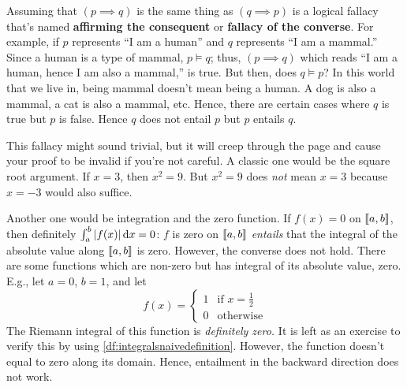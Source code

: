 Assuming that \((p \implies q)\) is the same thing as \((q \implies p)\) is a logical fallacy that's named \textbf{affirming the consequent} or \textbf{fallacy of the converse}. For example, if \(p\) represents \enquote{I am a human} and \(q\) represents \enquote{I am a mammal.} Since a human is a type of mammal, \(p \models q\); thus, \((p \implies q)\) which reads \enquote{I am a human, hence I am also a mammal,} is true. But then, does \(q \models p\)? In this world that we live in, being mammal doesn't mean being a human. A dog is also a mammal, a cat is also a mammal, etc. Hence, there are certain cases where \(q\) is true but \(p\) is false. Hence \(q\) does not entail \(p\) but \(p\) entails \(q\).

This fallacy might sound trivial, but it will creep through the page and cause your proof to be invalid if you're not careful. A classic one would be the square root argument. If \(x = 3\), then \(x^2 = 9\). But \(x^2 = 9\) does \emph{not} mean \(x = 3\) because \(x = -3\) would also suffice.

Another one would be integration and the zero function. If \(f(x) = 0\) on \(\cintv{a, b}\), then definitely \(\int_a^b |f(x)| \odif{x} = 0\): \(f\) is zero on \(\cintv{a, b}\) \emph{entails} that the integral of the absolute value along \(\cintv{a, b}\) is zero. However, the converse does not hold. There are some functions which are non-zero but has integral of its absolute value, zero. E.g., let \(a = 0\), \(b = 1\), and let
\begin{equation}
  f(x) = \begin{cases}
    1 & \textrm{if } x = \frac{1}{2} \\
    0 & \textrm{otherwise}
  \end{cases}
\end{equation}
The Riemann integral of this function is \emph{definitely zero.} It is left as an exercise to verify this by using \cref{df:integralsnaivedefinition}. However, the function doesn't equal to zero along its domain. Hence, entailment in the backward direction does not work.


